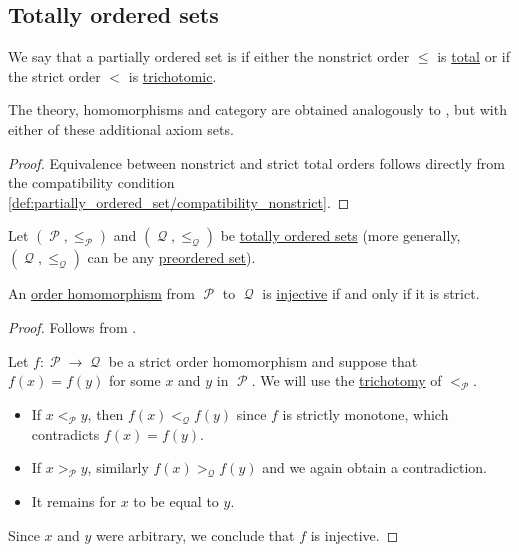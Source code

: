 \subsection{Totally ordered sets}\label{subsec:totally_ordered_sets}

\begin{definition}\label{def:totally_ordered_set}
  We say that a partially ordered set is  if either the nonstrict order \( \leq \) is \hyperref[def:binary_relation/total]{total} or if the strict order \( < \) is \hyperref[def:binary_relation/trichotomic]{trichotomic}.

  The theory, homomorphisms and category are obtained analogously to , but with either of these additional axiom sets.
\end{definition}
\begin{proof}
  Equivalence between nonstrict and strict total orders follows directly from the compatibility condition \eqref{def:partially_ordered_set/compatibility_nonstrict}.
\end{proof}

\begin{proposition}\label{thm:total_order_embedding_iff_strict}
  Let \( (\mscrP, \leq_\mscrP) \) and \( (\mscrQ, \leq_\mscrQ) \) be \hyperref[def:totally_ordered_set]{totally ordered sets} (more generally, \( (\mscrQ, \leq_\mscrQ) \) can be any \hyperref[def:preordered_set]{preordered set}).

  An \hyperref[def:partially_ordered_set/homomorphism]{order homomorphism} from \( \mscrP \) to \( \mscrQ \) is \hyperref[def:function_invertibility/injective]{injective} if and only if it is strict.
\end{proposition}
\begin{proof}
  \SufficiencySubProof Follows from .

  \NecessitySubProof Let \( f: \mscrP \to \mscrQ \) be a strict order homomorphism and suppose that \( f(x) = f(y) \) for some \( x \) and \( y \) in \( \mscrP \). We will use the \hyperref[def:binary_relation/trichotomic]{trichotomy} of \( <_\mscrP \).
  \begin{itemize}
    \item If \( x <_\mscrP y \), then \( f(x) <_\mscrQ f(y) \) since \( f \) is strictly monotone, which contradicts \( f(x) = f(y) \).

    \item If \( x >_\mscrP y \), similarly \( f(x) >_\mscrQ f(y) \) and we again obtain a contradiction.

    \item It remains for \( x \) to be equal to \( y \).
  \end{itemize}

  Since \( x \) and \( y \) were arbitrary, we conclude that \( f \) is injective.
\end{proof}

